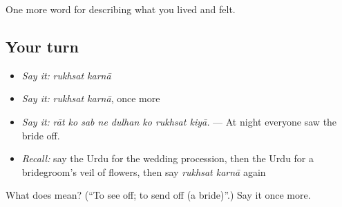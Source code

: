 \begin{grammarlens}[title={What you've built}]
One more word for describing what you lived and felt.
\end{grammarlens}

\subsection*{Your turn}
\begin{itemize}
\raggedright
  \item \emph{Say it:} \emph{rukhsat karnā}
  \item \emph{Say it:} \emph{rukhsat karnā}, once more
  \item \emph{Say it:} \emph{rāt ko sab ne dulhan ko rukhsat kiyā.} — At night everyone saw the bride off.
  \item \emph{Recall:} say the Urdu for the wedding procession, then the Urdu for a bridegroom's veil of flowers, then say \emph{rukhsat karnā} again
\end{itemize}

\begin{tcolorbox}[breakable,colback=teal!4,colframe=teal!35!black,title={Before you move on}]
What does   mean? (\textquotedblleft{}To see off; to send off (a bride)\textquotedblright{}.) Say it once more.
\end{tcolorbox}
